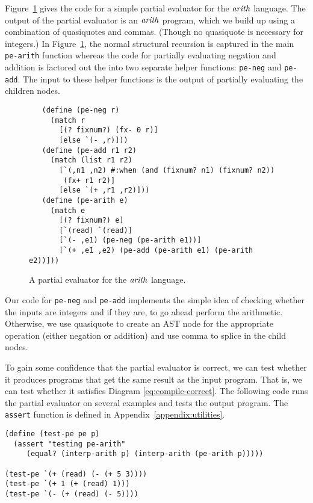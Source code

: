 \documentclass[12pt]{book}
\begin{document}
Figure~\ref{fig:pe-arith} gives the code for a simple partial
evaluator for the $\mathit{arith}$ language. The output of the partial
evaluator is an $\mathit{arith}$ program, which we build up using a
combination of quasiquotes and commas. (Though no quasiquote is
necessary for integers.) In Figure~\ref{fig:pe-arith}, the normal
structural recursion is captured in the main \texttt{pe-arith}
function whereas the code for partially evaluating negation and
addition is factored out the into two separate helper functions:
\texttt{pe-neg} and \texttt{pe-add}. The input to these helper
functions is the output of partially evaluating the children nodes.

\begin{figure}[tbp]
\begin{lstlisting}
   (define (pe-neg r)
     (match r
       [(? fixnum?) (fx- 0 r)]
       [else `(- ,r)]))
   (define (pe-add r1 r2)
     (match (list r1 r2)
       [`(,n1 ,n2) #:when (and (fixnum? n1) (fixnum? n2))
        (fx+ r1 r2)]
       [else `(+ ,r1 ,r2)]))
   (define (pe-arith e)
     (match e
       [(? fixnum?) e]
       [`(read) `(read)]
       [`(- ,e1) (pe-neg (pe-arith e1))]
       [`(+ ,e1 ,e2) (pe-add (pe-arith e1) (pe-arith e2))]))   
\end{lstlisting}
\caption{A partial evaluator for the $\mathit{arith}$ language.}
\label{fig:pe-arith}
\end{figure}

Our code for \texttt{pe-neg} and \texttt{pe-add} implements the simple
idea of checking whether the inputs are integers and if they are, to
go ahead perform the arithmetic.  Otherwise, we use quasiquote to
create an AST node for the appropriate operation (either negation or
addition) and use comma to splice in the child nodes.

To gain some confidence that the partial evaluator is correct, we can
test whether it produces programs that get the same result as the
input program. That is, we can test whether it satisfies Diagram
\eqref{eq:compile-correct}. The following code runs the partial
evaluator on several examples and tests the output program.  The
\texttt{assert} function is defined in Appendix~\ref{appendix:utilities}.
\begin{lstlisting}
(define (test-pe pe p)
  (assert "testing pe-arith"
     (equal? (interp-arith p) (interp-arith (pe-arith p)))))

(test-pe `(+ (read) (- (+ 5 3))))
(test-pe `(+ 1 (+ (read) 1)))
(test-pe `(- (+ (read) (- 5))))
\end{lstlisting}
\end{document}
